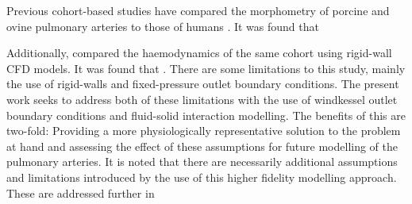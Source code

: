 Previous cohort-based studies have compared the morphometry of porcine and ovine pulmonary arteries to those of humans \citep{goubergrits2023ctbased}.
It was found that

Additionally, \citet{yevtushenkoSimulationBasedComparisonHuman2025} compared the haemodynamics of the same cohort using rigid-wall CFD models.
It was found that .
There are some limitations to this study, mainly the use of rigid-walls and fixed-pressure outlet boundary conditions.
The present work seeks to address both of these limitations with the use of windkessel outlet boundary conditions and fluid-solid interaction modelling.
The benefits of this are two-fold: Providing a more physiologically representative solution to the problem at hand and assessing the effect of these assumptions for future modelling of the pulmonary arteries.
It is noted that there are necessarily additional assumptions and limitations introduced by the use of this higher fidelity modelling approach.
These are addressed further in 


